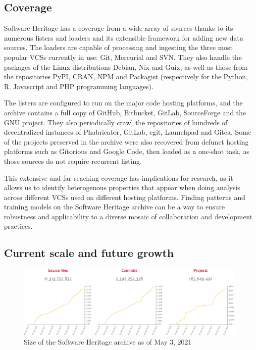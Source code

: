 \subsection{Coverage}

Software Heritage has a coverage from a wide array of sources thanks to its
numerous listers and loaders and its extensible framework for adding new data
sources. The loaders are capable of processing and ingesting the three most
popular \glspl{VCS} currently in use: Git, Mercurial and SVN\@. They also handle
the packages of the Linux distributions Debian, Nix and Guix, as well as those
from the repositories PyPI, CRAN, NPM and Packagist (respectively for the
Python, R, Javascript and PHP programming languages).

The listers are configured to run on the major code hosting platforms, and the
archive contains a full copy of GitHub, Bitbucket, GitLab, SourceForge and the
GNU project. They also periodically crawl the repositories of hundreds of
decentralized instances of Phabricator, GitLab, cgit, Launchpad and Gitea.
Some of the projects preserved in the archive were also recovered from defunct
hosting platforms such as Gitorious and Google Code, then loaded as a one-shot
task, as those sources do not require recurrent listing.


This extensive and far-reaching coverage has implications for research, as it
allows us to identify heterogenous properties that appear when doing analysis
across different \glspl{VCS} used on different hosting platforms. Finding
patterns and training models on the Software Heritage archive can be a way to
ensure robustness and applicability to a diverse mosaic of collaboration and
development practices.

\subsection{Current scale and future growth}

\begin{figure}
    \centering
    \includegraphics[width=0.9\linewidth]{img/swh-size}
    \caption{Size of the Software Heritage archive as of May 3, 2021}%
    \label{fig:swh-size}
\end{figure}

